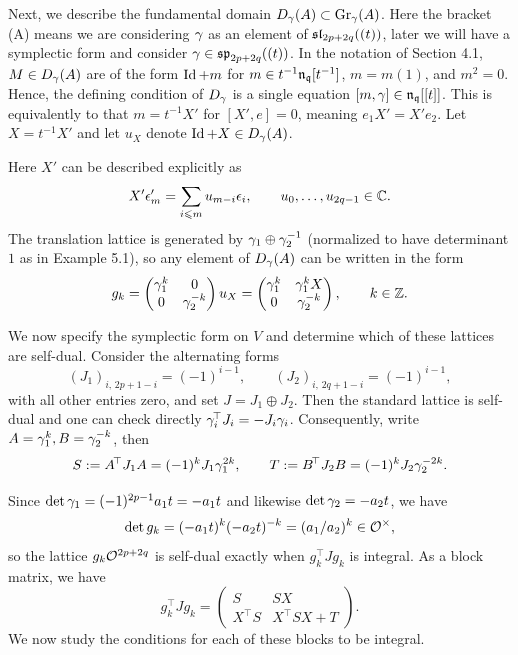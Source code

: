 \documentclass[11pt]{article}
\numberwithin{equation}{section}
\begin{document}
\begin{appendix}
Next, we describe the fundamental domain $D_\gamma(A)\subset \operatorname{Gr}_\gamma(A)$. Here the bracket (A) means we are considering $\gamma$ as an element of $\mathfrak{sl}_{2p+2q}((t))$, later we will have a symplectic form and consider $\gamma\in \mathfrak{sp}_{2p+2q}((t))$. In the notation of Section 4.1, $M\in D_\gamma(A)$ are of the form $\operatorname{Id}+m$ for $m\in t^{-1}\mathfrak{n}_{\mathfrak{q}}[t^{-1}]$, $m=m(1)$, and $m^2=0$. Hence, the defining condition of $D_\gamma$ is a single equation $[m,\gamma]\in  \mathfrak{n}_{\mathfrak{q}}[[t]]$. This is equivalently to that $m= t^{-1}X'$ for $[X',e]=0$, meaning $e_1X'=X'e_2$. Let $X=t^{-1}X'$ and let $u_X$ denote $\operatorname{Id}+ X\in D_\gamma(A)$.

Here $X'$ can be described explicitly as
\[
X'\epsilon'_m=\sum_{i\leqslant m}u_{m-i}\epsilon_i,
\qquad
u_0,\dots,u_{2q-1}\in\mathbb{C}.
\]
The translation lattice is generated by $\gamma_1\oplus\gamma_2^{-1}$ (normalized to have determinant $1$ as in Example 5.1), so any element of $D_\gamma(A)$ can be written in the form
\begin{equation}\label{eq:g}
g_k=\begin{pmatrix}
\gamma_1^k&0\\
0&\gamma_2^{-k}
\end{pmatrix}
u_X=
\begin{pmatrix}
\gamma_1^k&\gamma_1^kX\\
0&\gamma_2^{-k}
\end{pmatrix}
 ,
\qquad k\in\mathbb{Z}.
\end{equation}

We now  specify the symplectic form on $V$ and determine which of these lattices are self-dual. Consider the alternating forms
\[
(J_1)_{i,\,2p+1-i}=(-1)^{i-1},
\qquad
(J_2)_{i,\,2q+1-i}=(-1)^{i-1},
\]
with all other entries zero, and set $J=J_1\oplus J_2$. Then the standard lattice is self-dual and one can check directly $\gamma_i^{\!\top}J_i=-J_i\gamma_i$. Consequently, write $A=\gamma_1^k, B=\gamma_2^{-k}$,
then
\begin{equation}\label{eq:ST}
S:=A^{\!\top}J_1A=(-1)^kJ_1\gamma_1^{2k},
\qquad
T:=B^{\!\top}J_2B=(-1)^kJ_2\gamma_2^{-2k}.
\end{equation}

Since $\det\gamma_1=(-1)^{2p-1}a_1t=-a_1t$ and likewise $\det\gamma_2=-a_2t$, we have
\[
\det g_k=(-a_1t)^k(-a_2t)^{-k}=(a_1/a_2)^k\in\mathcal{O}^\times,
\]
so the lattice $g_k\mathcal{O}^{2p+2q}$ is self-dual exactly when $g_k^{\!\top}Jg_k$ is
integral. As a block matrix, we have
\begin{equation}\label{eq:gram}
g_k^{\!\top}Jg_k=
\begin{pmatrix}
S&SX\\
X^{\!\top}S&X^{\!\top}SX+T
\end{pmatrix}.
\end{equation}
We now study the conditions for each of these blocks to be integral.

\end{appendix}
\end{document}
